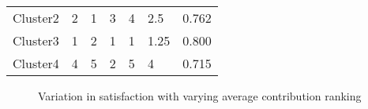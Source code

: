 \begin{table}[h]
\begin{tabular}{@{}lllllll@{}}
Cluster2                    & 2                                                                              & 1                                                                                   & 3                                                                                   & 4                                                                             & 2.5                                                                            & 0.762                                                                               \\
Cluster3                    & 1                                                                              & 2                                                                                   & 1                                                                                   & 1                                                                             & 1.25                                                                           & 0.800                                                                               \\
Cluster4                    & 4                                                                              & 5                                                                                   & 2                                                                                   & 5                                                                             & 4                                                                              & 0.715                                                                               \\ \bottomrule
\end{tabular}
\end{table}

\begin{figure} 
	\centering
	\setlength\figureheight{6cm} 
	\setlength\figurewidth{13cm} 
	 
	\caption{Variation in satisfaction with varying average contribution ranking} 
	\label{fig:SatisfactionVsRanking} 
\end{figure}

